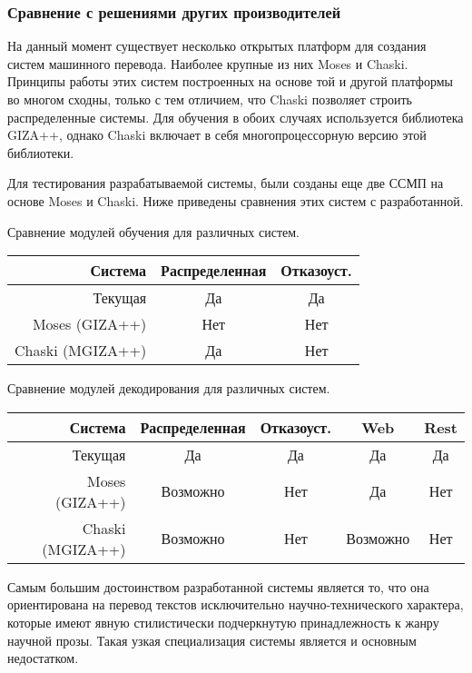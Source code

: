 \subsubsection{Сравнение с решениями других производителей}

На данный момент существует несколько открытых платформ 
для создания систем машинного перевода.
Наиболее крупные из них Moses и Chaski.
Принципы работы этих систем построенных на основе той и другой платформы 
во многом сходны, только с тем отличием, что Chaski позволяет строить распределенные системы. 
Для обучения в обоих случаях используется библиотека GIZA++, однако Chaski включает 
в себя многопроцессорную версию этой библиотеки.

Для тестирования разрабатываемой системы, были созданы еще две ССМП 
на основе Moses и Chaski.
Ниже приведены сравнения этих систем с разработанной.

\begin{dtable}{Сравнение модулей обучения для различных систем.}
	\begin{tabular}{|r|c|c|}
		\hline  \textbf{Система}		& \textbf{Распределенная} 	& \textbf{Отказоуст.} \\  
		\hline  Текущая 				& Да			 			& 	Да \\ 
		\hline  Moses (GIZA++)			& Нет			 			& 	Нет \\ 
		\hline  Chaski (MGIZA++)		& Да			 			& 	Нет \\ 
		\hline 
	\end{tabular} 
\end{dtable}
\begin{dtable}{Сравнение модулей декодирования для различных систем.}
	\begin{tabular}{|r|c|c|c|c|}
		\hline  \textbf{Система}		& \textbf{Распределенная} 	
			& \textbf{Отказоуст.}  & \textbf{Web} & \textbf{Rest}\\  
		\hline  Текущая 				& Да
			& 	{\centering Да  } & Да & Да  \\ 
		\hline  Moses (GIZA++)			& Возможно
			& 	{\centering Нет } & Да & Нет \\ 
		\hline  Chaski (MGIZA++)		& Возможно
			& 	{\centering Нет } & Возможно & Нет \\ 
		\hline 
	\end{tabular} 
\end{dtable}

Самым большим достоинством разработанной системы является то, 
что она ориентирована на перевод текстов исключительно научно-технического характера,
которые имеют явную стилистически подчеркнутую принадлежность к жанру научной прозы.
Такая узкая специализация системы является и основным недостатком.

\pagebreak

